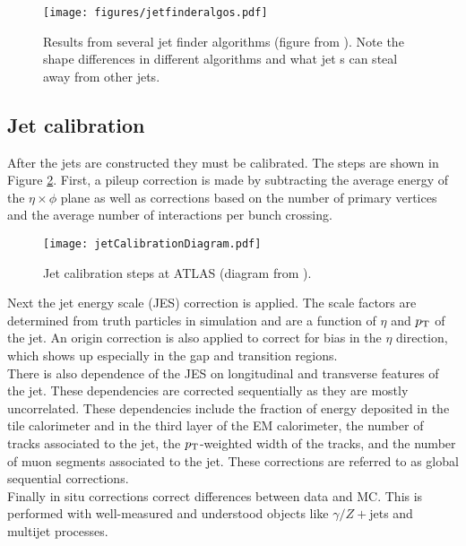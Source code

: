 \begin{figure}[h]
\centering
\texttt{[image: figures/jetfinderalgos.pdf]}
\caption[Jet finder algorithms]{Results from several jet finder algorithms (figure from \cite{antiKt}).  Note the shape differences in different algorithms and what jet \pt s can steal away from other jets.}
\label{fig:ktalgos} 
\end{figure}

\subsection{Jet calibration}

After the jets are constructed they must be calibrated.  The steps are shown in Figure \ref{fig:calsteps}.  First, a pileup correction is made by subtracting the average energy of the $\eta \times \phi$ plane as well as corrections based on the number of primary vertices and the average number of interactions per bunch crossing. \\

\begin{figure}[h]
\centering
\texttt{[image: jetCalibrationDiagram.pdf]}
\caption[Jet calibration steps at ATLAS ]{Jet calibration steps at ATLAS (diagram from \cite{Aaboud:2017jcu}).}
\label{fig:calsteps} 
\end{figure}

Next the jet energy scale (JES) correction is applied.  The scale factors are determined from truth particles in simulation and are a function of $\eta$ and $p_{\mathrm{T}}$ of the jet.  An origin correction is also applied to correct for bias in the $\eta$ direction, which shows up especially in the gap and transition regions. \\

There is also dependence of the JES on longitudinal and transverse features of the jet.  These dependencies are corrected sequentially as they are mostly uncorrelated.  These dependencies include the fraction of energy deposited in the tile calorimeter and in the third layer of the EM calorimeter, the number of tracks associated to the jet, the $p_{\mathrm{T}}$-weighted width of the tracks, and the number of muon segments associated to the jet.  These corrections are referred to as global sequential corrections. \\

Finally in situ corrections correct differences between data and MC.  This is performed with well-measured and understood objects like $\gamma / Z+$jets and multijet processes. \\

